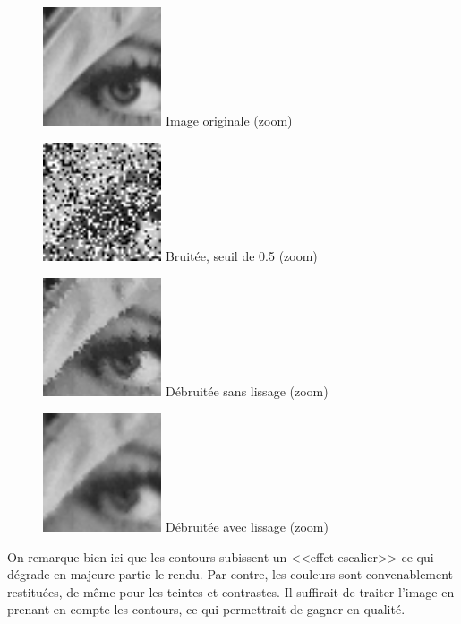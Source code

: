 \documentclass{article}
\begin{document}
		\begin{figure}[!ht]
			\centering
			\begin{minipage}[t]{3.5cm}
				\centering
				\includegraphics[width=3.5cm,height=3.5cm]{lenaZOOM.jpg}
				Image originale (zoom)
			\end{minipage}
			\begin{minipage}[t]{3.5cm}
				\centering
				\includegraphics[width=3.5cm,height=3.5cm]{SaltAndPepper/noisy_50_ZOOM.jpg}
				Bruitée, seuil de 0.5 (zoom)
			\end{minipage}
			\begin{minipage}[t]{3.5cm}
				\centering
				\includegraphics[width=3.5cm,height=3.5cm]{SaltAndPepper/algo1_50_ZOOM.jpg}
				Débruitée sans lissage (zoom)
			\end{minipage}
			\begin{minipage}[t]{3.5cm}
				\centering
				\includegraphics[width=3.5cm,height=3.5cm]{SaltAndPepper/algo2_50_ZOOM.jpg}
				Débruitée avec lissage (zoom)
			\end{minipage}
		\end{figure}
		On remarque bien ici que les contours subissent un <<effet escalier>> ce qui dégrade en majeure partie le rendu. Par contre, les couleurs sont convenablement restituées, de même pour les teintes et contrastes. Il suffirait de traiter l'image en prenant en compte les contours, ce qui permettrait de gagner en qualité.
\end{document}
